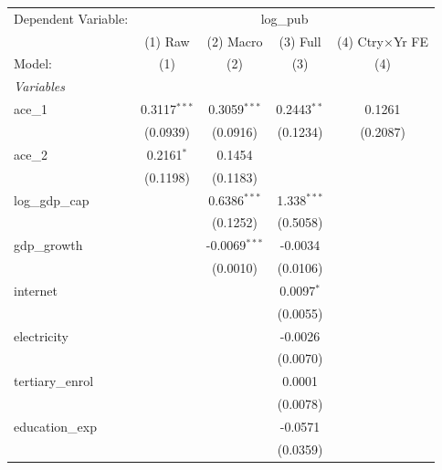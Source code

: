
\begingroup
\centering
\begin{tabular}{lcccc}
   \tabularnewline \midrule \midrule
   Dependent Variable: & \multicolumn{4}{c}{log\_pub}\\
                       & (1) Raw        & (2) Macro       & (3) Full                & (4) Ctry×Yr FE \\   
   Model:              & (1)            & (2)             & (3)                     & (4)\\  
   \midrule
   \emph{Variables}\\
   ace\_1              & 0.3117$^{***}$ & 0.3059$^{***}$  & 0.2443$^{**}$           & 0.1261\\   
                       & (0.0939)       & (0.0916)        & (0.1234)                & (0.2087)\\   
   ace\_2              & 0.2161$^{*}$   & 0.1454          &                         &   \\   
                       & (0.1198)       & (0.1183)        &                         &   \\   
   log\_gdp\_cap       &                & 0.6386$^{***}$  & 1.338$^{***}$           &   \\   
                       &                & (0.1252)        & (0.5058)                &   \\   
   gdp\_growth         &                & -0.0069$^{***}$ & -0.0034                 &   \\   
                       &                & (0.0010)        & (0.0106)                &   \\   
   internet            &                &                 & 0.0097$^{*}$            &   \\   
                       &                &                 & (0.0055)                &   \\   
   electricity         &                &                 & -0.0026                 &   \\   
                       &                &                 & (0.0070)                &   \\   
   tertiary\_enrol     &                &                 & 0.0001                  &   \\   
                       &                &                 & (0.0078)                &   \\   
   education\_exp      &                &                 & -0.0571                 &   \\   
                       &                &                 & (0.0359)                &   \\   

\end{tabular}
